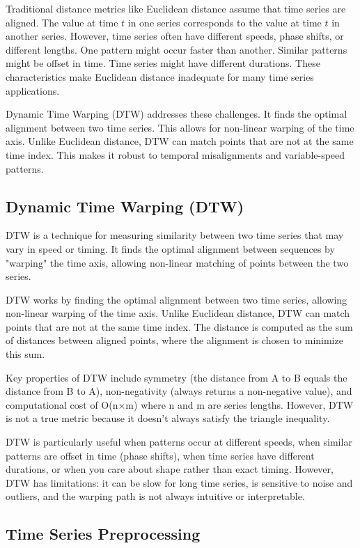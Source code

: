 Traditional distance metrics like Euclidean distance assume that time series are aligned. The value at time $t$ in one series corresponds to the value at time $t$ in another series. However, time series often have different speeds, phase shifts, or different lengths. One pattern might occur faster than another. Similar patterns might be offset in time. Time series might have different durations. These characteristics make Euclidean distance inadequate for many time series applications.

Dynamic Time Warping (DTW) addresses these challenges. It finds the optimal alignment between two time series. This allows for non-linear warping of the time axis. Unlike Euclidean distance, DTW can match points that are not at the same time index. This makes it robust to temporal misalignments and variable-speed patterns.

\subsection{Dynamic Time Warping (DTW)}

DTW is a technique for measuring similarity between two time series that may vary in speed or timing. It finds the optimal alignment between sequences by "warping" the time axis, allowing non-linear matching of points between the two series.

DTW works by finding the optimal alignment between two time series, allowing non-linear warping of the time axis. Unlike Euclidean distance, DTW can match points that are not at the same time index. The distance is computed as the sum of distances between aligned points, where the alignment is chosen to minimize this sum.

Key properties of DTW include symmetry (the distance from A to B equals the distance from B to A), non-negativity (always returns a non-negative value), and computational cost of O(n×m) where n and m are series lengths. However, DTW is not a true metric because it doesn't always satisfy the triangle inequality.

DTW is particularly useful when patterns occur at different speeds, when similar patterns are offset in time (phase shifts), when time series have different durations, or when you care about shape rather than exact timing. However, DTW has limitations: it can be slow for long time series, is sensitive to noise and outliers, and the warping path is not always intuitive or interpretable.

\subsection{Time Series Preprocessing}

